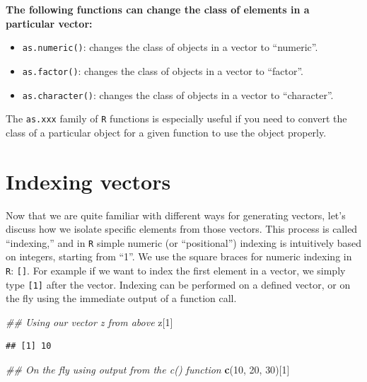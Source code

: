 \documentclass[]{book}
\newenvironment{Shaded}{\begin{snugshade}}{\end{snugshade}}
\newcommand{\CommentTok}[1]{\textcolor[rgb]{0.56,0.35,0.01}{\textit{#1}}}
\newcommand{\DecValTok}[1]{\textcolor[rgb]{0.00,0.00,0.81}{#1}}
\newcommand{\KeywordTok}[1]{\textcolor[rgb]{0.13,0.29,0.53}{\textbf{#1}}}
\newcommand{\NormalTok}[1]{#1}
\begin{document}
\textbf{The following functions can change the class of elements in a particular vector:}

\begin{itemize}
\item
  \texttt{as.numeric()}: changes the class of objects in a vector to ``numeric''.
\item
  \texttt{as.factor()}: changes the class of objects in a vector to ``factor''.
\item
  \texttt{as.character()}: changes the class of objects in a vector to ``character''.
\end{itemize}

The \texttt{as.xxx} family of \texttt{R} functions is especially useful if you need to convert the class of a particular object for a given function to use the object properly.

\hypertarget{indexing-vectors}{%
\section{Indexing vectors}\label{indexing-vectors}}

Now that we are quite familiar with different ways for generating vectors, let's discuss how we isolate specific elements from those vectors. This process is called ``indexing,'' and in \texttt{R} simple numeric (or ``positional'') indexing is intuitively based on integers, starting from ``1''. We use the square braces for numeric indexing in \texttt{R}: \texttt{{[}{]}}. For example if we want to index the first element in a vector, we simply type \texttt{{[}1{]}} after the vector. Indexing can be performed on a defined vector, or on the fly using the immediate output of a function call.

\begin{Shaded}
\begin{Highlighting}[]
\CommentTok{## Using our vector z from above}
\NormalTok{z[}\DecValTok{1}\NormalTok{]}
\end{Highlighting}
\end{Shaded}

\begin{verbatim}
## [1] 10
\end{verbatim}

\begin{Shaded}
\begin{Highlighting}[]
\CommentTok{## On the fly using output from the c() function}
\KeywordTok{c}\NormalTok{(}\DecValTok{10}\NormalTok{, }\DecValTok{20}\NormalTok{, }\DecValTok{30}\NormalTok{)[}\DecValTok{1}\NormalTok{]}
\end{Highlighting}
\end{Shaded}
\end{document}
